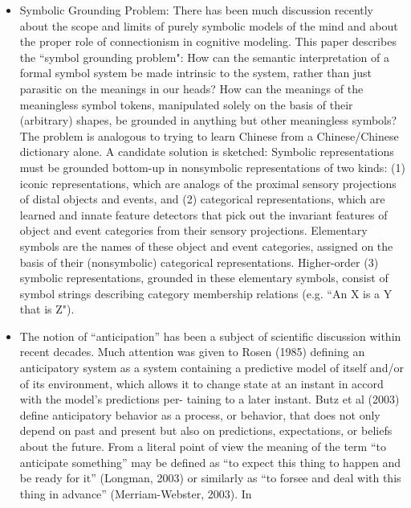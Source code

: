 \documentclass[]{usiinfdocprop}
\begin{document}
\begin{itemize}
   \item \citep{Harnad1990} Symbolic Grounding Problem: There has been much discussion recently about the scope and limits of purely symbolic models of the mind and about the proper role of connectionism in cognitive modeling. This paper describes the ``symbol grounding problem": How can the semantic interpretation of a formal symbol system be made intrinsic to the system, rather than just parasitic on the meanings in our heads? How can the meanings of the meaningless symbol tokens, manipulated solely on the basis of their (arbitrary) shapes, be grounded in anything but other meaningless symbols? The problem is analogous to trying to learn Chinese from a Chinese/Chinese dictionary alone. A candidate solution is sketched: Symbolic representations must be grounded bottom-up in nonsymbolic representations of two kinds: (1) iconic representations, which are analogs of the proximal sensory projections of distal objects and events, and (2) categorical representations, which are learned and innate feature detectors that pick out the invariant features of object and event categories from their sensory projections. Elementary symbols are the names of these object and event categories, assigned on the basis of their (nonsymbolic) categorical representations. Higher-order (3) symbolic representations, grounded in these elementary symbols, consist of symbol strings describing category membership relations (e.g. ``An X is a Y that is Z").
   
   
   
   \item \citep[Chapter 2.3]{Meisel2011}The notion of “anticipation” has been a subject of scientific discussion within recent decades. Much attention was given to Rosen (1985) defining an anticipatory system as a system containing a predictive model of itself and/or of its environment, which allows it to change state at an instant in accord with the model’s predictions per- taining to a later instant. Butz et al (2003) define anticipatory behavior as a process, or behavior, that does not only depend on past and present but also on predictions, expectations, or beliefs about the future. From a literal point of view the meaning of the term “to anticipate something” may be defined as “to expect this thing to happen and be ready for it” (Longman, 2003) or similarly as “to forsee and deal with this thing in advance” (Merriam-Webster, 2003). In
   
\end{itemize}
\end{document}
